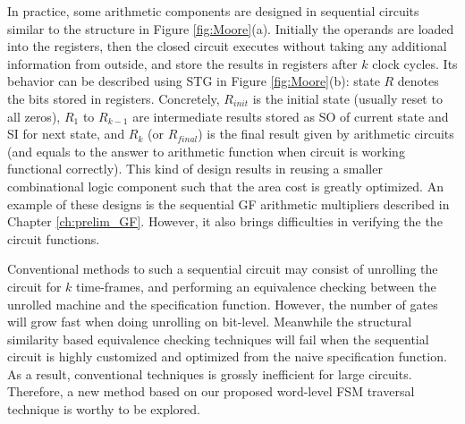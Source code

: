 In practice,
some arithmetic components are designed in sequential circuits similar to the structure in 
Figure \ref{fig:Moore}(a). Initially the operands are loaded into the registers, 
then the closed circuit executes without taking any additional information from outside,
and store the results in registers after $k$ clock cycles. Its behavior can be described using
STG in Figure \ref{fig:Moore}(b): state $R$ denotes the bits stored in registers. Concretely, $R_{init}$ is the initial
state (usually reset to all zeros), $R_1$ to $R_{k-1}$ are intermediate results stored as SO of current state and SI
for next state, and $R_k$ (or $R_{final}$) is the final result given by arithmetic circuits (and equals to the answer
to arithmetic function when circuit is working functional correctly).
This kind of design results in 
reusing a smaller combinational logic component such that the area cost is greatly optimized.
An example of these designs is the sequential GF arithmetic multipliers described in Chapter \ref{ch:prelim_GF}.
However, it also brings difficulties in verifying the the circuit functions.

\begin{figure}[H]
\end{figure}

Conventional methods to such a sequential circuit may consist of unrolling the circuit for 
$k$ time-frames, and performing an equivalence checking between the unrolled machine and
the specification function. However, the number of gates will grow fast when doing unrolling
on bit-level. Meanwhile the structural similarity based equivalence checking techniques 
will fail when the sequential circuit is highly customized and optimized from the naive specification 
function. As a result, conventional techniques is grossly inefficient for large circuits.
Therefore, a new method based on our proposed word-level FSM traversal technique is worthy to be explored.


